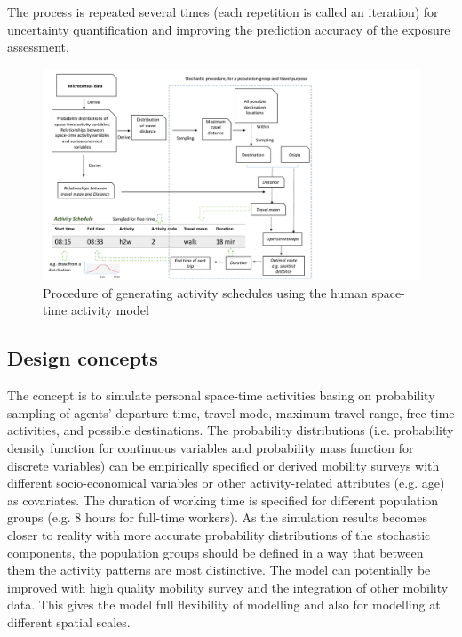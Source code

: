 \documentclass[]{article}
\begin{document}
 The process is repeated several times (each repetition is called an iteration) for uncertainty quantification and improving the prediction accuracy of the exposure assessment. 

\begin{figure}
    \centering
    \includegraphics[width=\linewidth]{figure/scheduleflow_noenrich.pdf}
  \caption{Procedure of generating activity schedules using the human space-time activity model}
    \label{fig:detail}
\end{figure}

\subsection{Design concepts}
The concept is to simulate personal space-time activities basing on probability sampling of agents' departure time, travel mode, maximum travel range, free-time activities, and possible destinations. The probability distributions (i.e. probability density function for continuous variables and probability mass function for discrete variables) can be empirically specified or derived mobility surveys with different socio-economical variables or other activity-related attributes (e.g. age) as covariates. The duration of working time is specified for different population groups (e.g. 8 hours for full-time workers). As the simulation results becomes closer to reality with more accurate probability distributions of the stochastic components, the population groups should be defined in a way that between them the activity patterns are most distinctive. The model can potentially be improved with high quality mobility survey and the integration of other mobility data.   This gives the model full flexibility of modelling and also for modelling at different spatial scales.     %
\end{document}
